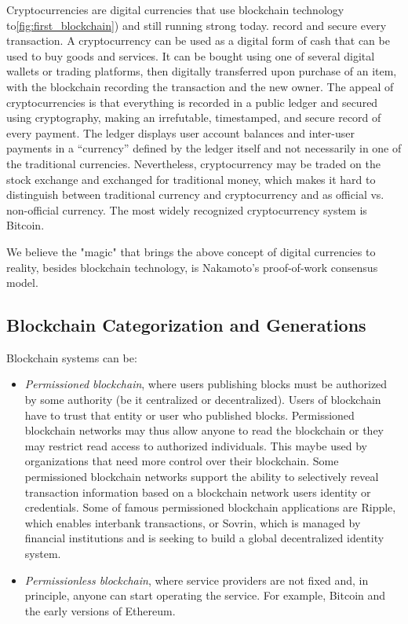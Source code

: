 Cryptocurrencies are digital currencies that use blockchain technology to\autoref{fig:first_blockchain}) and still running strong today. 
record and secure every transaction. 
A cryptocurrency can be used as a digital form of cash that can be used to buy goods and services. 
It can be bought using one of several digital wallets or trading platforms, then digitally transferred upon purchase of an item, with the blockchain recording the transaction and the new owner. 
The appeal of cryptocurrencies is that everything is recorded in a public ledger and secured using cryptography, making an irrefutable, timestamped, and secure record of every payment.
The ledger displays user account balances and inter-user payments in a “currency” defined by the ledger itself and not necessarily in one of the traditional currencies. 
Nevertheless, cryptocurrency may be traded on the stock exchange and exchanged for traditional money, which makes it hard to distinguish between traditional currency and cryptocurrency and as official vs. non-official currency. 
The most widely recognized cryptocurrency system is Bitcoin.

We believe the "magic" that brings the above concept of digital currencies to reality, besides blockchain technology, is Nakamoto's proof-of-work consensus model.

\subsection{Blockchain Categorization and Generations}

Blockchain systems can be:
\begin{itemize}
	\item \emph{Permissioned blockchain}, where users publishing blocks must be authorized by some authority (be it centralized or decentralized). 
	Users of blockchain have to trust that entity or user who published blocks. 
	Permissioned blockchain networks may thus allow anyone to read the blockchain or they may restrict read access to authorized individuals. This maybe used by organizations that need more control over their blockchain.
	Some permissioned blockchain networks support the ability to selectively reveal transaction information based on a blockchain network users identity or credentials. 
	Some of famous permissioned blockchain applications are Ripple, which enables interbank transactions, or Sovrin, which is managed by financial institutions and is seeking to build a global decentralized identity system.
	
	\item \emph{Permissionless blockchain}, where service providers are not fixed and, in principle, anyone can start operating the service. For example, Bitcoin and the early versions of Ethereum.
	
\end{itemize}

